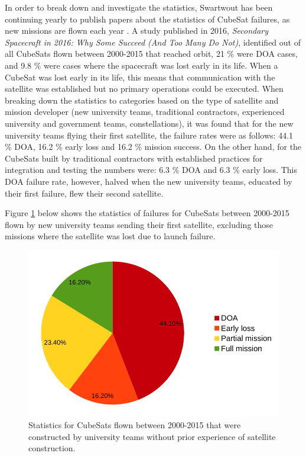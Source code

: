 \documentclass[english,12pt,a4paper,pdftex,elec,utf8]{aaltothesis}
\begin{document}
In order to break down and investigate the statistics, Swartwout has been continuing yearly to publish papers about the statistics of CubeSat failures, as new missions are flown each year \cite{Swart2016, Swart2015}. A study published in 2016, \textit{Secondary Spacecraft in 2016: Why Some Succeed (And Too Many Do Not)}, identified out of all CubeSats flown between 2000-2015 that reached orbit, 21 \% were DOA cases, and 9.8 \% were cases where the spacecraft was lost early in its life. When a CubeSat was lost early in its life, this means that communication with the satellite was established but no primary operations could be executed. When breaking down the statistics to categories based on the type of satellite and mission developer (new university teams, traditional contractors, experienced university and government teams, constellations), it was found that for the new university teams flying their first satellite, the failure rates were as follows: 44.1 \% DOA, 16.2 \% early loss and 16.2 \% mission success. On the other hand, for the CubeSats built by traditional contractors with established practices for integration and testing the numbers were: 6.3 \% DOA and 6.3 \% early loss. This DOA failure rate, however, halved when the new university teams, educated by their first failure, flew their second satellite. \cite{Swart2016, Swart2015}\par 
Figure \ref{hobbyistflown2015pic} below shows the statistics of failures for CubeSats between 2000-2015 flown by new university teams sending their first satellite, excluding those missions where the satellite was lost due to launch failure.\par 
\begin{figure}[h!]
\centering
\includegraphics[scale=0.5]{university2015}
%
\caption{Statistics for CubeSats flown between 2000-2015 that were constructed by university teams without prior experience of satellite construction. \cite{Swart2016}}
\label{hobbyistflown2015pic}
\end{figure} 
\end{document}
